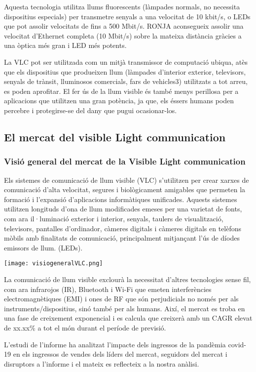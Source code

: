 Aquesta tecnologia utilitza llums fluorescents (làmpades normals, no necessita dispositius especials) per transmetre senyals a una velocitat de 10 kbit/s, o LEDs que pot assolir velocitats de fins a 500 Mbit/s. RONJA aconsegueix assolir una velocitat d'Ethernet completa (10 Mbit/s) sobre la mateixa distància gràcies a una òptica més gran i LED més potents.

La VLC pot ser utilitzada com un mitjà transmissor de computació ubiqua, atès que els dispositius que produeixen llum (làmpades d'interior exterior, televisors, senyals de trànsit, lluminosos comercials, fars de vehicles3) utilitzats a tot arreu, es poden aprofitar. El fer ús de la llum visible és també menys perillosa per a aplicacions que utilitzen una gran potència, ja que, els éssers humans poden percebre i protegirse-se del dany que pugui ocasionar-los.




\subsection*{El mercat del visible Light communication}

\subsubsection*{Visió general del mercat de la Visible Light communication}
Els sistemes de comunicació de llum visible (VLC) s'utilitzen per crear xarxes de comunicació d'alta velocitat, segures i biològicament amigables que permeten la formació i l'expansió d'aplicacions informàtiques unificades. Aquests sistemes utilitzen longituds d'ona de llum modificades emeses per una varietat de fonts, com ara il·luminació exterior i interior, senyals, taulers de visualització, televisors, pantalles d'ordinador, càmeres digitals i càmeres digitals en telèfons mòbils amb finalitats de comunicació, principalment mitjançant l'ús de díodes emissors de llum. (LEDs).

\begin{center}
    \texttt{[image: visiogeneralVLC.png]}\\\vfill
\end{center}

La comunicació de llum visible exclourà la necessitat d'altres tecnologies sense fil, com ara infrarojos (IR), Bluetooth i Wi-Fi que emeten interferències electromagnètiques (EMI) i ones de RF que són perjudicials no només per als instruments/dispositius, sinó també per als humans. Així, el mercat es troba en una fase de creixement exponencial i es calcula que creixerà amb un CAGR elevat de xx.xx\% a tot el món durant el període de previsió.

L'estudi de l'informe ha analitzat l'impacte dels ingressos de la pandèmia covid-19 en els ingressos de vendes dels líders del mercat, seguidors del mercat i disruptors a l'informe i el mateix es reflecteix a la nostra anàlisi.




